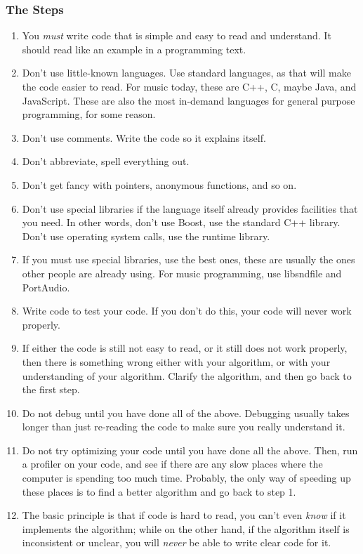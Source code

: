 \documentclass{beamer}
\begin{document}
\begin{frame}[allowframebreaks]
    \frametitle<presentation>{The Steps}
    \begin{enumerate}
        \item     
            You \textit{must} write code that is simple and easy to read and understand. It should read like an example in a programming text.
        \item
            Don't use little-known languages. Use standard languages, as that will make the code easier to read. For music today, these are C++, C, maybe Java, and JavaScript. These are also the most in-demand languages for general purpose programming, for some reason.
        \item
            Don't use comments. Write the code so it explains itself.
        \item
            Don't abbreviate, spell everything out.
        \item
            Don't get fancy with pointers, anonymous functions, and so on.
        \item
            Don't use special libraries if the language itself already provides facilities that you need. In other words, don't use Boost, use the standard C++ library. Don't use operating system calls, use the runtime library.
        \item
            If you must use special libraries, use the best ones, these are usually the ones other people are already using. For music programming, use libsndfile and PortAudio.
        \item
            Write code to test your code. If you don't do this, your code will never work properly.
        \item
            If either the code is still not easy to read, or it still does not work properly, then there is something wrong either with your algorithm, or with your understanding of your algorithm. Clarify the algorithm, and then go back to the first step. 
        \item
            Do not debug until you have done all of the above. Debugging usually takes longer than just re-reading the code to make sure you really understand it.
        \item
            Do not try optimizing your code until you have done all the above. Then, run a profiler on your code, and see if there are any slow places where the computer is spending too much time. Probably, the only way of speeding up these places is to find a better algorithm and go back to step 1.
        \item
            The basic principle is that if code is hard to read, you can't even \textit{know} if it implements the algorithm; while on the other hand, if the algorithm itself is inconsistent or unclear, you will \textit{never} be able to write clear code for it. 
    \end{enumerate}    
\end{frame}
\end{document}
